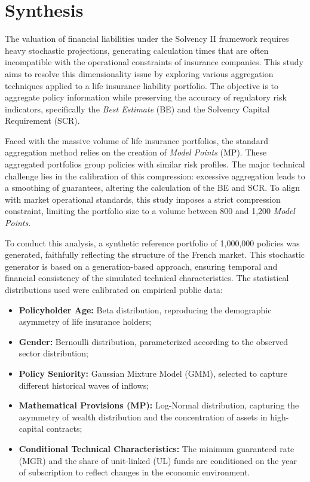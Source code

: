 \chapter*{Synthesis}
\label{chap:summary_english}

The valuation of financial liabilities under the Solvency II framework requires heavy stochastic projections, generating calculation times that are often incompatible with the operational constraints of insurance companies. This study aims to resolve this dimensionality issue by exploring various aggregation techniques applied to a life insurance liability portfolio. The objective is to aggregate policy information while preserving the accuracy of regulatory risk indicators, specifically the \textit{Best Estimate} (BE) and the Solvency Capital Requirement (SCR).

Faced with the massive volume of life insurance portfolios, the standard aggregation method relies on the creation of \textit{Model Points} (MP). These aggregated portfolios group policies with similar risk profiles. The major technical challenge lies in the calibration of this compression: excessive aggregation leads to a smoothing of guarantees, altering the calculation of the BE and SCR. To align with market operational standards, this study imposes a strict compression constraint, limiting the portfolio size to a volume between 800 and 1,200 \textit{Model Points}.

To conduct this analysis, a synthetic reference portfolio of 1,000,000 policies was generated, faithfully reflecting the structure of the French market. This stochastic generator is based on a generation-based approach, ensuring temporal and financial consistency of the simulated technical characteristics. The statistical distributions used were calibrated on empirical public data:
\begin{itemize}
    \item \textbf{Policyholder Age:} Beta distribution, reproducing the demographic asymmetry of life insurance holders;
    \item \textbf{Gender:} Bernoulli distribution, parameterized according to the observed sector distribution;
    \item \textbf{Policy Seniority:} Gaussian Mixture Model (GMM), selected to capture different historical waves of inflows;
    \item \textbf{Mathematical Provisions (MP):} Log-Normal distribution, capturing the asymmetry of wealth distribution and the concentration of assets in high-capital contracts;
    \item \textbf{Conditional Technical Characteristics:} The minimum guaranteed rate (MGR) and the share of unit-linked (UL) funds are conditioned on the year of subscription to reflect changes in the economic environment.
\end{itemize}

